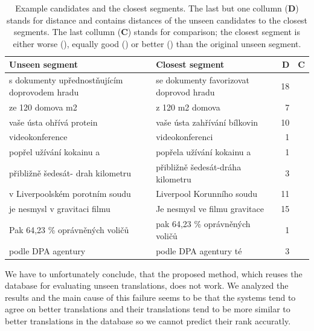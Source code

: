 \begin{table}
  \begin{center}
    \begin{tabular}{|p{5.5cm}p{5.5cm}rc|}
      \hline
      \textbf{Unseen segment} & \textbf{Closest segment} & \textbf{D} & \textbf{C} \\
      \hline
      s dokumenty upřednostňujícím doprovodem hradu & se dokumenty favorizovat doprovod hradu & 18 & \worse{} \\ \hline
      ze 120 domova m2 & z 120 m2 domova & 7 & \better{} \\ \hline
      vaše ústa ohřívá protein & vaše ústa zahřívání bílkovin & 10 & \better{} \\ \hline
      videokonference & videokonferenci & 1 & \better{} \\ \hline
      popřel užívání kokainu a & popřela užívání kokainu a & 1 & \worse{} \\ \hline
      přibližně šedesát- drah kilometru & přibližně šedesát-dráha kilometru & 3 & \equal{} \\ \hline
      v Liverpoolském porotním soudu & Liverpool Korunního soudu & 11 & \better{} \\ \hline
      je nesmysl v gravitaci filmu & Je nesmysl ve filmu gravitace & 15 & \better{} \\ \hline
      Pak 64,23 \% oprávněných voličů & pak 64,23 \% oprávněných voličů & 1 & \better{} \\ \hline
      podle DPA agentury & podle DPA agentury té & 3 & \worse{} \\ \hline
    \end{tabular}
  \end{center}

  \caption[Example candidates and the closest segments]{ Example candidates and
    the closest segments. The last but one collumn (\textbf{D}) stands for
    distance and contains distances of the unseen candidates to the closest
    segments. The last collumn (\textbf{C}) stands for comparison; the closest
  segment is either worse (\worse{}), equally good (\equal{}) or better
(\better{}) than the original unseen segment.}

  \label{segments-closest}
\end{table}

We have to unfortunately conclude, that the proposed method, which reuses the
database for evaluating unseen translations, does not work. We analyzed the
results and the main cause of this failure seems to be that the systems tend to
agree on better translations and their translations tend to be more similar to
better translations in the database so we cannot predict their rank accuratly. 

